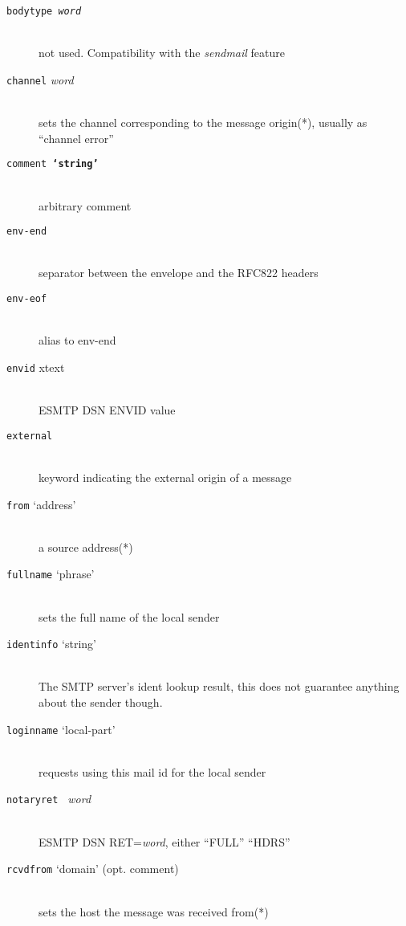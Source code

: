\begin{description}
\item[{\tt bodytype {\em word}} ] \mbox{} \\
not used. Compatibility with the {\em sendmail} feature 

\item[{\tt channel} {\em word}] \mbox{} \\
sets the channel corresponding to the message origin(*),
usually as ``channel error''

\item[{\tt comment {\bf `string'}} ] \mbox{} \\
arbitrary comment

\item[{\tt env-end}] \mbox{} \\
separator between the envelope and the RFC822 headers

\item[{\tt env-eof}] \mbox{} \\
alias to env-end

\item[{\tt envid} xtext] \mbox{} \\
ESMTP DSN ENVID value

\item[{\tt external}] \mbox{} \\
keyword indicating the external origin of a message

\item[{\tt from} `address'] \mbox{} \\
a source address(*)

\item[{\tt fullname} `phrase'] \mbox{} \\
sets the full name of the local sender

\item[{\tt identinfo} `string'] \mbox{} \\
The SMTP server's ident lookup result, this does not guarantee anything
about the sender though.

\item[{\tt loginname} `local-part'] \mbox{} \\
requests using this mail id for the local sender

\item[{\tt notaryret } {\em word}] \mbox{} \\
ESMTP DSN RET={\em word}, either ``FULL'' ``HDRS''

\item[{\tt rcvdfrom} `domain' (opt. comment)] \mbox{}\\
sets the host the message was received from(*)


\end{description}
